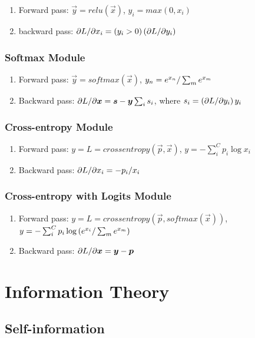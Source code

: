 \begin{enumerate}
	\item Forward pass: $\vec{y}=relu(\vec{x})$, $y_i=max(0,x_i)$
	\item backward pass: $\partial L/\partial x_i=(y_i>0)\left(\partial L/\partial y_i\right)$
\end{enumerate}

\subsubsection*{Softmax Module}

\begin{enumerate}
	\item Forward pass: $\vec{y}=softmax(\vec{x})$, $y_n=e^{x_n}/\sum_m e^{x_m}$
	\item Backward pass: $\partial L/\partial\boldsymbol{x}=\boldsymbol{s}-\boldsymbol{y}\sum_i s_i$, where $s_i=\left(\partial L/\partial y_i\right)y_i$
\end{enumerate}

\subsubsection*{Cross-entropy Module}

\begin{enumerate}
	\item Forward pass: $y=L=crossentropy(\vec{p},\vec{x})$, $y=-\sum_i^C p_i\log x_i$
	\item Backward pass: $\partial L/\partial x_i=-p_i/x_i$
\end{enumerate}

\subsubsection*{Cross-entropy with Logits Module}

\begin{enumerate}
	\item Forward pass: $y=L=crossentropy(\vec{p},softmax(\vec{x}))$, $y=-\sum_i^Cp_i\log\left(e^{x_i}/\sum_m e^{x_m}\right)$
	\item Backward pass: $\partial L/\partial\boldsymbol{x}=\boldsymbol{y}-\boldsymbol{p}$
\end{enumerate}

\section{Information Theory}
\label{section2.4}

\subsection{Self-information}

